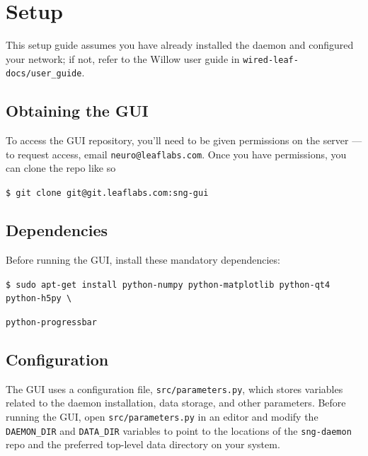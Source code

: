
\section{Setup}
\label{sec_setup}

This setup guide assumes you have already installed the daemon and configured your network; if not, refer to the Willow user guide in \texttt{wired-leaf-docs/user\_guide}.

\subsection{Obtaining the GUI}
\label{sec_setup_obtaining}

To access the GUI repository, you'll need to be given permissions on the server --- to request access, email \texttt{neuro@leaflabs.com}. Once you have permissions, you can clone the repo like so

\vspace{5mm}
\texttt{\$ git clone git@git.leaflabs.com:sng-gui}
\vspace{5mm}

\subsection{Dependencies}
\label{sec_setup_deps}

Before running the GUI, install these mandatory dependencies:

\vspace{5mm}
\texttt{\$ sudo apt-get install python-numpy python-matplotlib python-qt4 python-h5py \textbackslash}

\hspace*{20mm}\texttt{python-progressbar}
\vspace{5mm}

\subsection{Configuration}
\label{sec_setup_config}

The GUI uses a configuration file, \texttt{src/parameters.py}, which stores variables related to the daemon installation, data storage, and other parameters. Before running the GUI, open \texttt{src/parameters.py} in an editor and modify the \texttt{DAEMON\_DIR} and \texttt{DATA\_DIR} variables to point to the locations of the \texttt{sng-daemon} repo and the preferred top-level data directory on your system.

